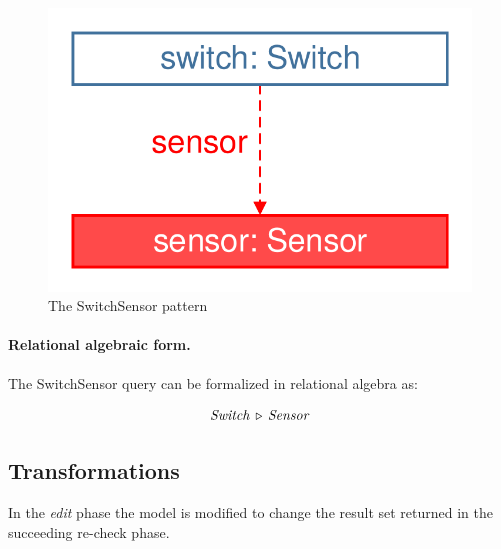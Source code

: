 \begin{figure}[Htb]
		\centering
		\includegraphics[scale=0.4]{figures/trainbenchmark-switchsensor}
		\caption{The \textsf{SwitchSensor} pattern}
		\label{fig:trainbenchmark-switchsensor}
\end{figure}

\paragraph{Relational algebraic form.} The \textsf{SwitchSensor} query can be formalized in relational algebra as:

$$ \mathit{Switch} \, \triangleright \, \mathit{Sensor} $$


\subsection{Transformations}
\label{sec:transformatios}

In the \emph{edit} phase the model is modified to change the result set returned in the succeeding re-check phase.

